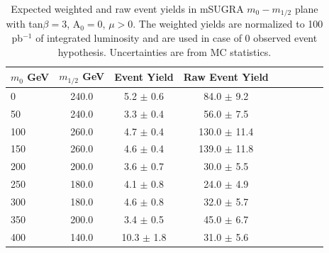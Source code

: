 \begin{table}[hbt]
\begin{center}
\renewcommand{\arraystretch}{2.0}
 {\footnotesize
\begin{tabular}{|l|c|c|c|c|c|c|c|c|}\hline
$m_{0}$ GeV & $m_{1/2}$ GeV & Event Yield & Raw Event Yield \\ \hline
0 & 240.0 & 5.2 $\pm$ 0.6 & 84.0 $\pm$ 9.2 \\ 
50 & 240.0 & 3.3 $\pm$ 0.4 & 56.0 $\pm$ 7.5 \\ 
100 & 260.0 & 4.7 $\pm$ 0.4 & 130.0 $\pm$ 11.4 \\ 
150 & 260.0 & 4.6 $\pm$ 0.4 & 139.0 $\pm$ 11.8 \\ 
200 & 200.0 & 3.6 $\pm$ 0.7 & 30.0 $\pm$ 5.5 \\ 
250 & 180.0 & 4.1 $\pm$ 0.8 & 24.0 $\pm$ 4.9 \\ 
300 & 180.0 & 4.6 $\pm$ 0.8 & 32.0 $\pm$ 5.7 \\ 
350 & 200.0 & 3.4 $\pm$ 0.5 & 45.0 $\pm$ 6.7 \\ 
400 & 140.0 & 10.3 $\pm$ 1.8 & 31.0 $\pm$ 5.6 \\ \hline
\end{tabular} }
\caption{Expected weighted and raw event yields in mSUGRA $m_{0}-m_{1/2}$ plane with tan$\beta = 3$, A$_0 = 0$, $\mu > 0$. The weighted yields are normalized to 100 pb$^{-1}$ of integrated luminosity and are used in case of 0 observed event hypothesis. Uncertainties are from MC statistics. \label{tab:ssyields_ex0}}
\end{center}
\end{table}


